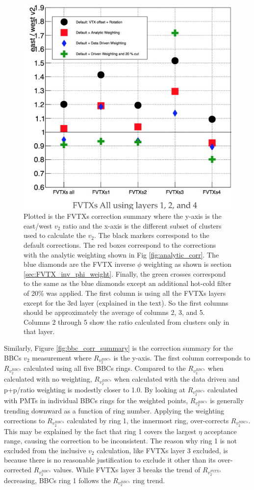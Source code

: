 \begin{figure}[!h]
\begin{center}
\includegraphics[width=0.5\linewidth]{figs/fvtx_correction_summary.png}
\caption{Plotted is the FVTXs correction summary where the y-axis is the east/west $v_2$ ratio and the x-axis is the different subset of clusters used to calculate the $v_2$. The black markers correspond to the default corrections. The red boxes correspond to the corrections with the analytic weighting shown in Fig \ref{fig:analytic_corr}. The blue diamonds are the FVTX inverse $\phi$ weighting as shown is section \ref{sec:FVTX_inv_phi_weight}. Finally, the green crosses correspond to the same as the blue diamonds except an additional hot-cold filter of 20\% was applied. The first column is using all the FVTXs layers except for the 3rd layer (explained in the text). So the first columns should be approximately the average of columns 2, 3, and 5. Columns 2 through 5 show the ratio calculated from clusters only in that layer.}
\label{fig:fvtx_corr_summary}
\end{center}
\end{figure}

Similarly, Figure \ref{fig:bbc_corr_summary} is the correction summary for the BBCs $v_2$ measurement where $R_{v_2^{BBCs}}$ is the y-axis. The first column corresponds to $R_{v_2^{BBCs}}$ calculated using all five BBCs rings. Compared to the $R_{v_2^{BBCs}}$ when calculated with no weighting, $R_{v_2^{BBCs}}$ when calculated with the data driven and p+p/\pau ratio weighting is modestly closer to 1.0. By looking at $R_{v_2^{BBCs}}$ calculated with PMTs in individual BBCs rings for the weighted points, $R_{v_2^{BBCs}}$ is generally trending downward as a function of ring number. Applying the weighting corrections to $R_{v_2^{BBCs}}$ calculated by ring 1, the innermost ring, over-corrects $R_{v_2^{BBCs}}$. This may be explained by the fact that ring 1 covers the largest $\eta$ acceptance range, causing the correction to be inconsistent. The reason why ring 1 is not excluded from the inclusive $v_2$ calculation, like FVTXs layer 3 excluded, is because there is no reasonable justification to exclude it other than its over-corrected $R_{v_2^{BBCs}}$ values. While FVTXs layer 3 breaks the trend of $R_{v_2^{FVTXs}}$ decreasing, BBCs ring 1 follows the $R_{v_2^{BBCs}}$ ring trend.

